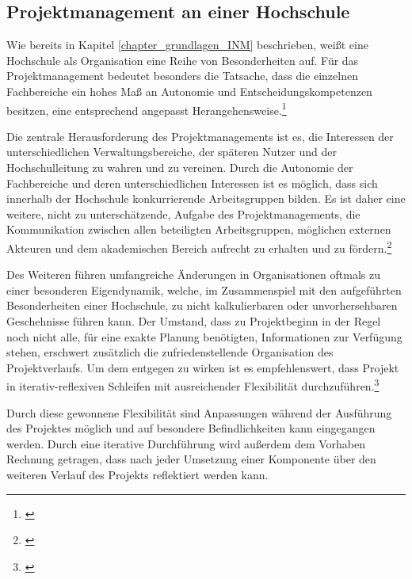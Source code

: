 \subsection{Projektmanagement an einer Hochschule}
\label{subsection_projektmanagement_hochschule}
Wie bereits in Kapitel \ref{chapter_grundlagen_INM} beschrieben, weißt eine Hochschule als Organisation eine Reihe von Besonderheiten auf. Für das Projektmanagement bedeutet besonders die Tatsache, dass die einzelnen Fachbereiche ein hohes Maß an Autonomie und Entscheidungskompetenzen besitzen, eine entsprechend angepasst Herangehensweise.\footnote{\cite{hansen_business_2009}}

Die zentrale Herausforderung des Projektmanagements ist es, die Interessen der unterschiedlichen Verwaltungsbereiche, der späteren Nutzer und der Hochschulleitung zu wahren und zu vereinen. Durch die Autonomie der Fachbereiche und deren unterschiedlichen Interessen ist es möglich, dass sich innerhalb der Hochschule konkurrierende Arbeitsgruppen bilden. Es ist daher eine weitere, nicht zu unterschätzende, Aufgabe des Projektmanagements, die Kommunikation zwischen allen beteiligten Arbeitsgruppen, möglichen externen Akteuren und dem akademischen Bereich aufrecht zu erhalten und zu fördern.\footnote{\cite{altvater_organisation_2007}}

Des Weiteren führen umfangreiche Änderungen in Organisationen oftmals zu einer besonderen Eigendynamik, welche, im Zusammenspiel mit den aufgeführten Besonderheiten einer Hochschule, zu nicht kalkulierbaren oder unvorhersehbaren Geschehnisse führen kann. Der Umstand, dass zu Projektbeginn in der Regel noch nicht alle, für eine exakte Planung benötigten, Informationen zur Verfügung stehen, erschwert zusätzlich die zufriedenstellende Organisation des Projektverlaufs. Um dem entgegen zu wirken ist es empfehlenswert, dass Projekt in iterativ-reflexiven Schleifen mit ausreichender Flexibilität durchzuführen.\footnote{\cite{hansen_business_2009}}

Durch diese gewonnene Flexibilität sind Anpassungen während der Ausführung des Projektes möglich und auf besondere Befindlichkeiten kann eingegangen werden. Durch eine iterative Durchführung wird außerdem dem Vorhaben Rechnung getragen, dass nach jeder Umsetzung einer Komponente über den weiteren Verlauf des Projekts reflektiert werden kann.

